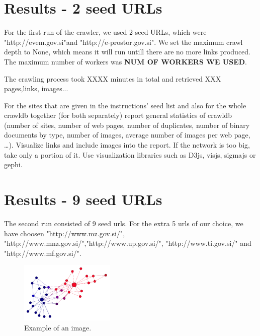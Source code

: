 \documentclass[9pt]{IEEEtran}
\begin{document}
\section{Results - 2 seed URLs}
For the first run of the crawler, we used 2 seed URLs, which were "http://evem.gov.si"and "http://e-prostor.gov.si". We set the maximum crawl depth to None, which means it will run untill there are no more links produced. The maximum number of workers was \textbf{NUM OF WORKERS WE USED}.

The crawling process took XXXX minutes in total and retrieved XXX pages,links, images...

For the sites that are given in the instructions’ seed list and also for the whole crawldb together (for both separately) report general statistics of crawldb (number of sites, number of web pages, number of duplicates, number of binary documents by type, number of images, average number of images per web page, …). Visualize links and include images into the report. If the network is too big, take only a portion of it. Use visualization libraries such as D3js, visjs, sigmajs or gephi.

\section{Results - 9 seed URLs}
The second run consisted of 9 seed urls. For the extra 5 urls of our choice, we have choosen "http://www.mz.gov.si/", "http://www.mnz.gov.si/","http://www.up.gov.si/", "http://www.ti.gov.si/" and "http://www.mf.gov.si/". 




\begin{figure}[h] \centering
    \includegraphics[width=0.4\textwidth]{karate.png}
    \caption{{Example of an image.}}
    \label{fig:karate}
\end{figure}
\end{document}
